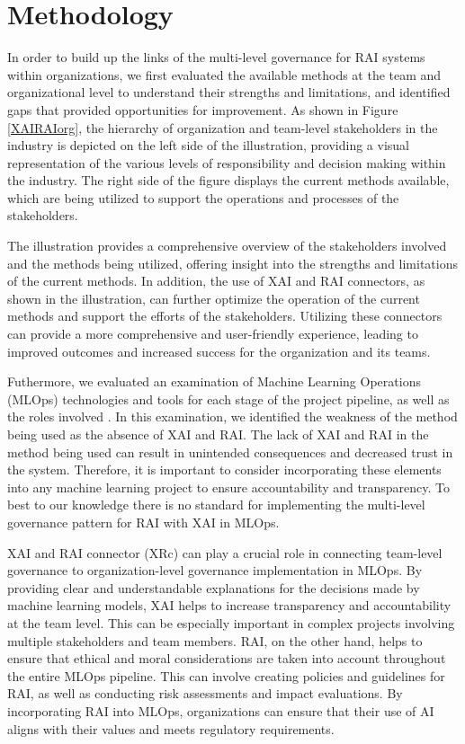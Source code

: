 \documentclass[conference]{IEEEtran}
\begin{document}
\section{Methodology}
In order to build up the links of the multi-level governance for RAI systems within organizations, we first evaluated the available methods at the team and organizational level \cite{catalogue} to understand their strengths and limitations, and identified gaps that provided opportunities for improvement. As shown in Figure \ref{XAIRAIorg}, the hierarchy of organization and team-level stakeholders in the industry is depicted on the left side of the illustration, providing a visual representation of the various levels of responsibility and decision making within the industry. The right side of the figure displays the current methods available, which are being utilized to support the operations and processes of the stakeholders.

The illustration provides a comprehensive overview of the stakeholders involved and the methods being utilized, offering insight into the strengths and limitations of the current methods. In addition, the use of XAI and RAI connectors, as shown in the illustration, can further optimize the operation of the current methods and support the efforts of the stakeholders. Utilizing these connectors can provide a more comprehensive and user-friendly experience, leading to improved outcomes and increased success for the organization and its teams.

Futhermore, we evaluated an examination of Machine Learning Operations (MLOps) technologies and tools for each stage of the project pipeline, as well as the roles involved \cite{mlops-without}. In this examination, we identified the weakness of the method being used as the absence of XAI and RAI. The lack of XAI and RAI in the method being used can result in unintended consequences and decreased trust in the system. Therefore, it is important to consider incorporating these elements into any machine learning project to ensure accountability and transparency. To best to our knowledge there is no standard for implementing the multi-level governance pattern for RAI with XAI in MLOps.

XAI and RAI connector (XRc) can play a crucial role in connecting team-level governance to organization-level governance implementation in MLOps. By providing clear and understandable explanations for the decisions made by machine learning models, XAI helps to increase transparency and accountability at the team level. This can be especially important in complex projects involving multiple stakeholders and team members. RAI, on the other hand, helps to ensure that ethical and moral considerations are taken into account throughout the entire MLOps pipeline. This can involve creating policies and guidelines for RAI, as well as conducting risk assessments and impact evaluations. By incorporating RAI into MLOps, organizations can ensure that their use of AI aligns with their values and meets regulatory requirements.
\end{document}
